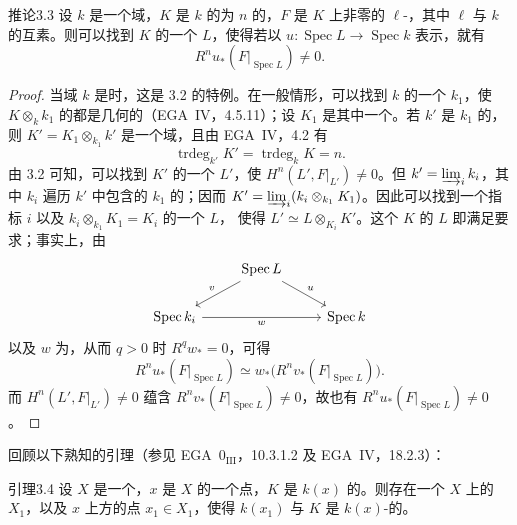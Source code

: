 \begin{SGAresult}{推论}{3.3}
设 $k$ 是一个域，$K$ 是 $k$ 的为 $n$ 的，$F$ 是 $K$ 上非零的 $\ell$-，其中 $\ell$ 与 $k$ 的互素。则可以找到 $K$ 的一个 $L$，使得若以 $u:\operatorname{Spec}L\to\operatorname{Spec}k$ 表示，就有
\[
R^nu_*(F|_{\operatorname{Spec}L})\ne0.
\]
\end{SGAresult}
\begin{proof}
当域 $k$ 是时，这是 3.2 的特例。在一般情形，可以找到 $k$ 的一个 $k_1$，使 $K\otimes_k k_1$ 的都是几何的（EGA~IV，4.5.11）；设 $K_1$ 是其中一个。若 $k'$ 是 $k_1$ 的，则 $K'=K_1\otimes_{k_1}k'$ 是一个域，且由 EGA~IV，4.2 有
\[
\operatorname{trdeg}_{k'}K'=\operatorname{trdeg}_kK=n.
\]
由 3.2 可知，可以找到 $K'$ 的一个 $L'$，使 $H^n(L',F|_{L'})\ne0$。但 $k'=\varinjlim_i k_i$，其中 $k_i$ 遍历 $k'$ 中包含的 $k_1$ 的；因而 $K'=\varinjlim_i(k_i\otimes_{k_1}K_1)$。因此可以找到一个指标 $i$ 以及 $k_i\otimes_{k_1}K_1=K_i$ 的一个 $L$，
使得 $L'\simeq L\otimes_{K_i}K'$。这个 $K$ 的 $L$ 即满足要求；事实上，由
\[
\begin{tikzcd}
&\operatorname{Spec}L\arrow[dl,"v"']\arrow[dr,"u"]&\\
\operatorname{Spec}k_i\arrow[rr,"w"']&&\operatorname{Spec}k
\end{tikzcd}
\]
以及 $w$ 为，从而 $q>0$ 时 $R^qw_*=0$，可得
\[
R^nu_*(F|_{\operatorname{Spec}L})\simeq w_*\bigl(R^nv_*(F|_{\operatorname{Spec}L})\bigr).
\]
而 $H^n(L',F|_{L'})\ne0$ 蕴含 $R^nv_*(F|_{\operatorname{Spec}L})\ne0$，故也有 $R^nu_*(F|_{\operatorname{Spec}L})\ne0$。
\end{proof}
回顾以下熟知的引理（参见 EGA~$0_{\mathrm{III}}$，10.3.1.2 及 EGA~IV，18.2.3）：
\begin{SGAresult}{引理}{3.4}
设 $X$ 是一个，$x$ 是 $X$ 的一个点，$K$ 是 $k(x)$ 的。则存在一个 $X$ 上的 $X_1$，以及 $x$ 上方的点 $x_1\in X_1$，使得 $k(x_1)$ 与 $K$ 是 $k(x)$-的。
\end{SGAresult}
